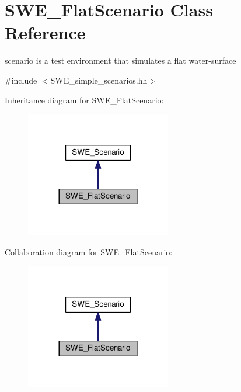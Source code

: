\hypertarget{classSWE__FlatScenario}{}\section{S\+W\+E\+\_\+\+Flat\+Scenario Class Reference}
\label{classSWE__FlatScenario}


scenario is a test environment that simulates a flat water-\/surface  




{\ttfamily \#include $<$S\+W\+E\+\_\+simple\+\_\+scenarios.\+hh$>$}



Inheritance diagram for S\+W\+E\+\_\+\+Flat\+Scenario\+:\nopagebreak
\begin{figure}[H]
\begin{center}
\leavevmode
\includegraphics[width=180pt]{classSWE__FlatScenario__inherit__graph}
\end{center}
\end{figure}


Collaboration diagram for S\+W\+E\+\_\+\+Flat\+Scenario\+:\nopagebreak
\begin{figure}[H]
\begin{center}
\leavevmode
\includegraphics[width=180pt]{classSWE__FlatScenario__coll__graph}
\end{center}
\end{figure}
